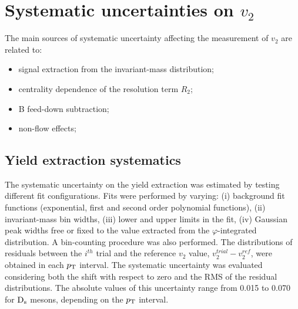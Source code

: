 \section{Systematic uncertainties on $v_2$}
\label{sec:systsectionV2}
The main sources of systematic uncertainty affecting the measurement of 
$v_2$ are related to: 
\begin{itemize}
\item signal extraction from the invariant-mass
distribution;
\item centrality dependence of the resolution term $R_2$;
\item B feed-down subtraction;
\item non-flow effects;
\end{itemize}

\subsection{Yield extraction systematics}
\label{sec:rawYv2}
The systematic uncertainty on the yield extraction was 
estimated by testing different fit configurations.
Fits were performed by varying: (i) background fit functions
(exponential, first and second order polynomial functions), (ii) invariant-mass bin
widths, (iii) lower and upper limits in the fit, (iv) Gaussian peak widths free or fixed to the value
extracted from the $\varphi$-integrated distribution. A bin-counting procedure
was also performed. The distributions of
residuals between the $i^{th}$ trial and the reference $v_2$ value, 
$v_2^{trial}-v_2^{ref}$, were obtained in each $p_{\rm T}$ interval. 
The systematic uncertainty was evaluated
considering both the shift with respect to zero and the RMS of the residual
distributions. The absolute values of this uncertainty range from 
0.015 to 0.070 for ${\rm D_s}$ mesons, depending on the $p_{\rm T}$ interval.

